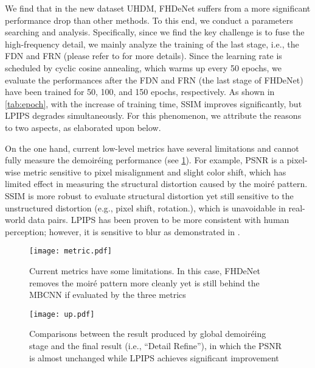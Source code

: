 \documentclass[runningheads]{llncs}
\newcommand{\ie}{i.e.}
\newcommand{\eg}{e.g.}
\begin{document}
We find that in the new dataset UHDM, FHDeNet suffers from a more significant performance drop than other methods. To this end, we conduct a parameters searching and analysis. Specifically, since we find the key challenge is to fuse the high-frequency detail, we mainly analyze the training of the last stage, \ie, the FDN and FRN (please refer to \cite{he2020fhde} for more details). Since the learning rate is scheduled by cyclic cosine annealing, which warms up every 50 epochs,  we evaluate the performances after the FDN and FRN (the last stage of FHDeNet) have been trained for 50, 100, and 150 epochs, respectively. As shown in \cref{tab:epoch}, with the increase of training time, SSIM improves significantly, but LPIPS degrades simultaneously. 
For this phenomenon, we attribute the reasons to two aspects, as elaborated upon below.

On the one hand, current low-level metrics have several limitations and cannot fully measure the demoiréing performance (see \cref{fig:metric}). For example, PSNR is a pixel-wise metric sensitive to pixel misalignment and slight color shift, which has limited effect in measuring the structural distortion caused by the moiré pattern. SSIM is more robust to evaluate structural distortion yet still sensitive to the unstructured distortion (\eg,  pixel shift, rotation.), which is unavoidable in real-world data pairs. LPIPS has been proven to be more consistent with human perception; however, it is sensitive to blur as demonstrated in \cite{zhang2018unreasonable}. 

\begin{figure}
   \begin{center}
      \texttt{[image: metric.pdf]}
   \end{center}
      
      \caption{Current metrics have some limitations. In this case, FHDeNet removes the moiré pattern more cleanly yet is still behind the MBCNN if evaluated by the three metrics }
      
   \label{fig:metric}
\end{figure}

\begin{figure}
   \begin{center}
      \texttt{[image: up.pdf]}
   \end{center}
      
      \caption{Comparisons between the result produced by global demoiréing stage and the final result (\ie, ``Detail Refine''), in which the PSNR is almost unchanged while LPIPS achieves significant improvement }
      
   \label{fig:up}
\end{figure}
\end{document}
